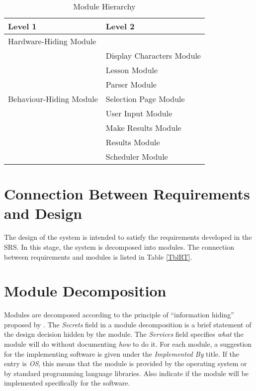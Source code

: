 \documentclass[12pt, titlepage]{article}
\begin{document}
\begin{table}[h!]
\centering
\begin{tabular}{p{} p{}}
\toprule
\textbf{Level 1} & \textbf{Level 2}\\
\midrule

{Hardware-Hiding Module} & ~ \\
\midrule

\multirow{7}{0.3\textwidth}{Behaviour-Hiding Module} & Display Characters Module\\
& Lesson Module\\
& Parser Module\\
& Selection Page Module\\
& User Input Module\\
\midrule

\multirow{3}{0.3\textwidth}{Software Decision Module} & {Make Results Module}\\
& Results Module\\
& Scheduler Module \\
\bottomrule

\end{tabular}
\caption{Module Hierarchy}
\label{TblMH}
\end{table}
\section{Connection Between Requirements and Design} \label{SecConnection}

The design of the system is intended to satisfy the requirements developed in
the SRS. In this stage, the system is decomposed into modules. The connection
between requirements and modules is listed in Table \ref{TblRT}.

\section{Module Decomposition} \label{SecMD}

Modules are decomposed according to the principle of ``information hiding''
proposed by \citet{ParnasEtAl1984}. The \emph{Secrets} field in a module
decomposition is a brief statement of the design decision hidden by the
module. The \emph{Services} field specifies \emph{what} the module will do
without documenting \emph{how} to do it. For each module, a suggestion for the
implementing software is given under the \emph{Implemented By} title. If the
entry is \emph{OS}, this means that the module is provided by the operating
system or by standard programming language libraries.  Also indicate if the
module will be implemented specifically for the software.
\end{document}
